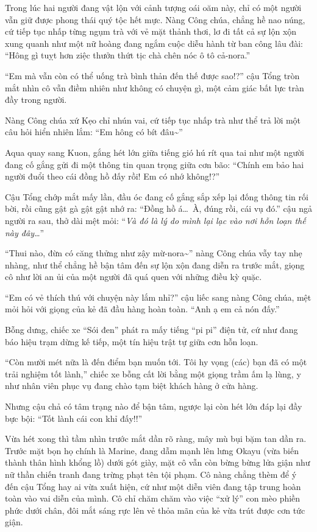 \documentclass[../main.tex]{subfiles}
\begin{document}
Trong lúc hai người đang vật lộn với cảnh tượng oái oăm này, chỉ có một người vẫn giữ được phong thái quý tộc hết mực. Nàng Công chúa, chẳng hề nao núng, cứ tiếp tục nhấp từng ngụm trà với vẻ mặt thảnh thơi, lơ đi tất cả sự lộn xộn xung quanh như một nữ hoàng đang ngắm cuộc diễu hành từ ban công lâu đài: ``Hông gì tuỵt hơn ziệc thưởn thứt tịc chà chên nóc ô tô cả-nora.''

``Em mà vẫn còn có thể uống trà bình thản đến thế được sao!?'' cậu Tổng tròn mắt nhìn cô vẫn điềm nhiên như không có chuyện gì, một cảm giác bất lực tràn đầy trong người.

Nàng Công chúa xứ Kẹo chỉ nhún vai, cứ tiếp tục nhấp trà như thể trả lời một câu hỏi hiển nhiên lắm: ``Em hông có bít đâu\~{}''

Aqua quay sang Kuon, gắng hét lớn giữa tiếng gió hú rít qua tai như một người đang cố gắng gửi đi một thông tin quan trọng giữa cơn bão: ``Chính em bảo hai người đuổi theo cái đồng hồ đấy rồi! Em có nhớ không!?''

Cậu Tổng chớp mắt mấy lần, đầu óc đang cố gắng sắp xếp lại đống thông tin rối bời, rồi cũng gật gà gật gật nhớ ra: ``Đồng hồ á\dots\ À, đúng rồi, cái vụ đó.'' cậu ngả người ra sau, thở dài mệt mỏi: ``\textit{Và đó là lý do mình lại lạc vào nơi hỗn loạn thế này đây\dots}''

``Thui nào, đừn có căng thửng như zậy mừ-nora\~{}'' nàng Công chúa vẫy tay nhẹ nhàng, như thể chẳng hề bận tâm đến sự lộn xộn đang diễn ra trước mắt, giọng cô như lời an ủi của một người đã quá quen với những điều kỳ quặc.

``Em có vẻ thích thú với chuyện này lắm nhỉ?'' cậu liếc sang nàng Công chúa, mệt mỏi hỏi với giọng của kẻ đã đầu hàng hoàn toàn. ``Anh ạ em cả nón đấy.''

Bỗng dưng, chiếc xe ``Sói đen'' phát ra mấy tiếng ``pi pi'' điện tử, cứ như đang báo hiệu trạm dừng kế tiếp, một tín hiệu trật tự giữa cơn hỗn loạn.


``Còn mười mét nữa là đến điểm bạn muốn tới. Tôi hy vọng (các) bạn đã có một trải nghiệm tốt lành,'' chiếc xe bỗng cất lời bằng một giọng trầm ấm lạ lùng, y như nhân viên phục vụ đang chào tạm biệt khách hàng ở cửa hàng.

Nhưng cậu chả có tâm trạng nào để bận tâm, ngược lại còn hét lớn đáp lại đầy bực bội: ``Tốt lành cái con khỉ đấy!!''

Vừa hét xong thì tầm nhìn trước mắt dần rõ ràng, mây mù bụi bặm tan dần ra. Trước mặt bọn họ chính là Marine, đang dẫm mạnh lên lưng Okayu (vừa biến thành thân hình khổng lồ) dưới gót giày, mặt cô vẫn còn bừng bừng lửa giận như nữ thần chiến tranh đang trừng phạt tên tội phạm. Cô nàng chẳng thèm để ý đến cậu Tổng hay ai vừa xuất hiện, cứ như một diễn viên đang tập trung hoàn toàn vào vai diễn của mình. Cô chỉ chăm chăm vào việc ``xử lý'' con mèo phiền phức dưới chân, đôi mắt sáng rực lên vẻ thỏa mãn của kẻ vừa trút được cơn tức giận.
\end{document}
